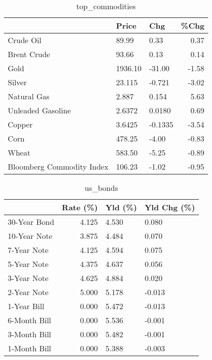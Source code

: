 \documentclass{article}%
\begin{document}
\begin{table}[htbp]%
\caption{top\_commodities}%
\centering%
\begin{adjustbox}{width=1\textwidth}%
\begin{tabular}{lllr}
\toprule
                          &   Price &     Chg &  \%Chg \\
\midrule
               Crude Oil  &   89.99 &    0.33 &  0.37 \\
             Brent Crude  &   93.66 &    0.13 &  0.14 \\
                    Gold  & 1936.10 &  -31.00 & -1.58 \\
                  Silver  &  23.115 &  -0.721 & -3.02 \\
             Natural Gas  &   2.887 &   0.154 &  5.63 \\
       Unleaded Gasoline  &  2.6372 &  0.0180 &  0.69 \\
                  Copper  &  3.6425 & -0.1335 & -3.54 \\
                    Corn  &  478.25 &   -4.00 & -0.83 \\
                   Wheat  &  583.50 &   -5.25 & -0.89 \\
Bloomberg Commodity Index &  106.23 &   -1.02 & -0.95 \\
\bottomrule
\end{tabular}
%
\end{adjustbox}%
\end{table}

%


\begin{table}[htbp]%
\caption{us\_bonds}%
\centering%
\begin{adjustbox}{width=1\textwidth}%
\begin{tabular}{lrll}
\toprule
             &  Rate (\%) & Yld (\%) & Yld Chg (\%) \\
\midrule
30-Year Bond &     4.125 &   4.530 &       0.080 \\
10-Year Note &     3.875 &   4.484 &       0.070 \\
 7-Year Note &     4.125 &   4.594 &       0.075 \\
 5-Year Note &     4.375 &   4.637 &       0.056 \\
 3-Year Note &     4.625 &   4.884 &       0.020 \\
 2-Year Note &     5.000 &   5.178 &      -0.013 \\
 1-Year Bill &     0.000 &   5.472 &      -0.013 \\
6-Month Bill &     0.000 &   5.536 &      -0.001 \\
3-Month Bill &     0.000 &   5.482 &      -0.001 \\
1-Month Bill &     0.000 &   5.388 &      -0.003 \\
\bottomrule
\end{tabular}
%
\end{adjustbox}%
\end{table}
\end{document}
